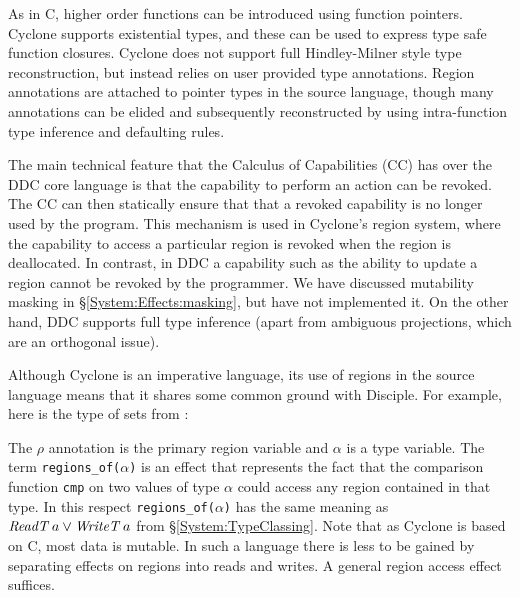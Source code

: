 As in C, higher order functions can be introduced using function pointers. Cyclone supports existential types, and these can be used to express type safe function closures. Cyclone does not support full Hindley-Milner style type reconstruction, but instead relies on user provided type annotations. Region annotations are attached to pointer types in the source language, though many annotations can be elided and subsequently reconstructed by using intra-function type inference and defaulting rules.

The main technical feature that the Calculus of Capabilities (CC) has over the DDC core language is that the capability to perform an action can be revoked. The CC can then statically ensure that that a revoked capability is no longer used by the program. This mechanism is used in Cyclone's region system, where the capability to access a particular region is revoked when the region is deallocated. In contrast, in DDC a capability such as the ability to update a region cannot be revoked by the programmer. We have discussed mutability masking in \S\ref{System:Effects:masking}, but have not implemented it. On the other hand, DDC supports full type inference (apart from ambiguous projections, which are an orthogonal issue).

Although Cyclone is an imperative language, its use of regions in the source language means that it shares some common ground with Disciple. For example, here is the type of sets from \cite{grossman:region-cyclone}:


The $\rho$ annotation is the primary region variable and $\alpha$ is a type variable. The term \texttt{regions\_of(}$\alpha$\texttt{)} is an effect that represents the fact that the comparison function \texttt{cmp} on two values of type $\alpha$ could access any region contained in that type. In this respect \texttt{regions\_of(}$\alpha$\texttt{)} has the same meaning as $\operatorname{\mathit{ReadT}} a \lor \operatorname{\mathit{WriteT}} a$ from \S\ref{System:TypeClassing}. Note that as Cyclone is based on C, most data is mutable. In such a language there is less to be gained by separating effects on regions into reads and writes. A general region access effect suffices.


